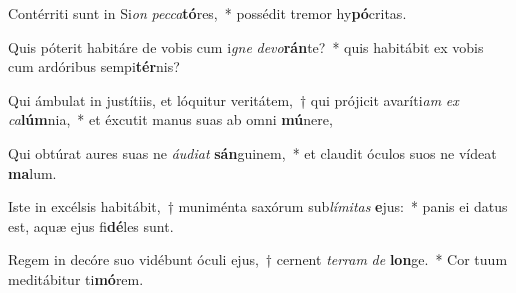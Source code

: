 \item Contérriti sunt in Si\textit{on} \textit{pec}\textit{ca}\textbf{tó}res,~* possédit tremor hy\textbf{pó}critas.
\item Quis póterit habitáre de vobis cum i\textit{gne} \textit{de}\textit{vo}\textbf{rán}te?~* quis habitábit ex vobis cum ardóribus sempi\textbf{tér}nis?
\item Qui ámbulat in justítiis, et lóquitur veritátem,~† qui prójicit avaríti\textit{am} \textit{ex} \textit{ca}\textbf{lúm}nia,~* et éxcutit manus suas ab omni \textbf{mú}nere,
\item Qui obtúrat aures suas ne \textit{áu}\textit{di}\textit{at} \textbf{sán}guinem,~* et claudit óculos suos ne vídeat \textbf{ma}lum.
\item Iste in excélsis habitábit,~† muniménta saxórum sub\textit{lí}\textit{mi}\textit{tas} \textbf{e}jus:~* panis ei datus est, aquæ ejus fi\textbf{dé}les sunt.
\item Regem in decóre suo vidébunt óculi ejus,~† cernent \textit{ter}\textit{ram} \textit{de} \textbf{lon}ge.~* Cor tuum meditábitur ti\textbf{mó}rem.
